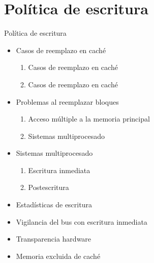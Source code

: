 \documentclass[presentation]{beamer}
\begin{document}
\section{Política de escritura}
\label{sec:org0618344}
\begin{frame}[allowframebreaks]{Política de escritura}
\begin{itemize}
\item Casos de reemplazo en caché
\begin{enumerate}
\item Casos de reemplazo en caché
\item Casos de reemplazo en caché
\end{enumerate}
\item Problemas al reemplazar bloques
\begin{enumerate}
\item Acceso múltiple a la memoria principal
\item Sistemas multiprocesado
\end{enumerate}
\item Sistemas multiprocesado
\begin{enumerate}
\item Escritura inmediata
\item Postescritura
\end{enumerate}
\item Estadísticas de escritura
\item Vigilancia del bus con escritura inmediata
\item Transparencia hardware
\item Memoria excluida de caché
\end{itemize}
\end{frame}
\end{document}
